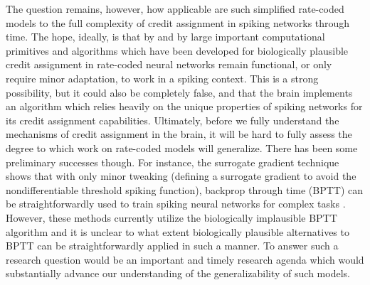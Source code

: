 The question remains, however, how applicable are such simplified rate-coded models to the full complexity of credit assignment in spiking networks through time. The hope, ideally, is that by and by large important computational primitives and algorithms which have been developed for biologically plausible credit assignment in rate-coded neural networks remain functional, or only require minor adaptation, to work in a spiking context. This is a strong possibility, but it could also be completely false, and that the brain implements an algorithm which relies heavily on the unique properties of spiking networks for its credit assignment capabilities. Ultimately, before we fully understand the mechanisms of credit assignment in the brain, it will be hard to fully assess the degree to which work on rate-coded models will generalize. There has been some preliminary successes though. For instance, the surrogate gradient technique shows that with only minor tweaking (defining a surrogate gradient to avoid the nondifferentiable threshold spiking function), backprop through time (BPTT) can be straightforwardly used to train spiking neural networks for complex tasks \citep{zenke2018superspike,neftci2019surrogate}. However, these methods currently utilize the biologically implausible BPTT algorithm and it is unclear to what extent biologically plausible alternatives to BPTT can be straightforwardly applied in such a manner. To answer such a research question would be an important and timely research agenda which would substantially advance our understanding of the generalizability of such models.

